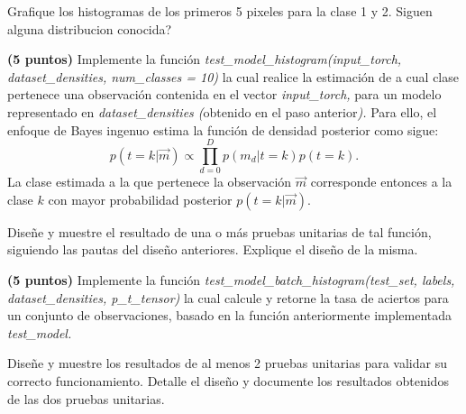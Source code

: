 \documentclass[spanish]{article}
\begin{document}
\begin{myEnumerate}
\begin{myEnumerate}
\begin{myEnumerate}
\begin{myEnumerate}
\begin{myEnumerate}
                \item Grafique los histogramas de los primeros 5 pixeles para la clase 1
                y 2. Siguen alguna distribucion conocida?
            \end{myEnumerate}
            \item \textbf{(5 puntos)} Implemente la funci\'{o}n \emph{test\_model\_histogram(input\_torch,
            dataset\_densities, num\_classes = 10) }la cual realice la estimaci\'{o}n
            de a cual clase pertenece una observaci\'{o}n contenida en el vector
            \emph{input\_torch, }para un modelo representado en \emph{dataset\_densities
            (}obtenido en el paso anterior\emph{). }Para ello, el enfoque de Bayes
            ingenuo estima la funci\'{o}n de densidad posterior como sigue:
            \[
            p\left(t=k|\overrightarrow{m}\right)\propto\prod_{d=0}^{D}p\left(m_{d}|t=k\right)p\left(t=k\right).
            \]
            La clase estimada a la que pertenece la observaci\'{o}n $\overrightarrow{m}$
            corresponde entonces a la clase $k$ con mayor probabilidad posterior
            $p\left(t=k|\overrightarrow{m}\right)$.
            \begin{myEnumerate}
                \item Dise\~{n}e y muestre el resultado de una o m\'{a}s pruebas unitarias
                de tal funci\'{o}n, siguiendo las pautas del dise\~{n}o anteriores.
                Explique el dise\~{n}o de la misma.
            \end{myEnumerate}
            
        \item \textbf{(5 puntos)} Implemente la funci\'{o}n \emph{test\_model\_batch\_histogram(test\_set,
        labels, dataset\_densities, p\_t\_tensor) }la cual calcule y retorne
        la tasa de aciertos para un conjunto de observaciones, basado en la
        funci\'{o}n anteriormente implementada \emph{test\_model.}
            \begin{myEnumerate}
                \item Dise\~{n}e y muestre los resultados de al menos 2 pruebas unitarias
                para validar su correcto funcionamiento. Detalle el dise\~{n}o y documente
                los resultados obtenidos de las dos pruebas unitarias.
            \end{myEnumerate}
        \end{myEnumerate}
    \end{myEnumerate}
\end{myEnumerate}


\end{myEnumerate}
\end{document}
